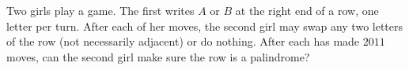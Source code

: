 Two girls play a game. The first writes $A$ or $B$ at the right end of a row, one letter per turn. After each of her moves, the second girl may swap any two letters of the row (not necessarily adjacent) or do nothing. After each has made $2011$ moves, can the second girl make sure the row is a palindrome?
